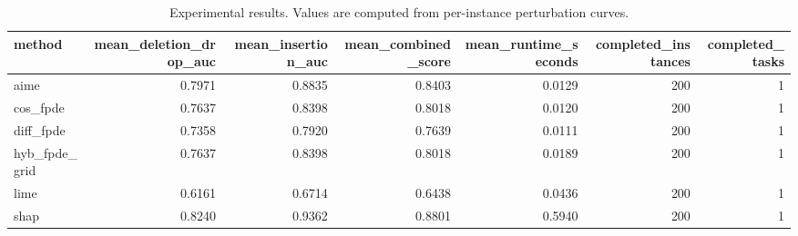 \begin{table}[t]
\caption{Experimental results. Values are computed from per-instance perturbation curves.}
\label{tab:main_results_computed}
\centering
\begin{tabular}{lrrrrrr}
\toprule
method & mean\_deletion\_drop\_auc & mean\_insertion\_auc & mean\_combined\_score & mean\_runtime\_seconds & completed\_instances & completed\_tasks \\
\midrule
aime & 0.7971 & 0.8835 & 0.8403 & 0.0129 & 200 & 1 \\
cos\_fpde & 0.7637 & 0.8398 & 0.8018 & 0.0120 & 200 & 1 \\
diff\_fpde & 0.7358 & 0.7920 & 0.7639 & 0.0111 & 200 & 1 \\
hyb\_fpde\_grid & 0.7637 & 0.8398 & 0.8018 & 0.0189 & 200 & 1 \\
lime & 0.6161 & 0.6714 & 0.6438 & 0.0436 & 200 & 1 \\
shap & 0.8240 & 0.9362 & 0.8801 & 0.5940 & 200 & 1 \\
\bottomrule
\end{tabular}

\end{table}
